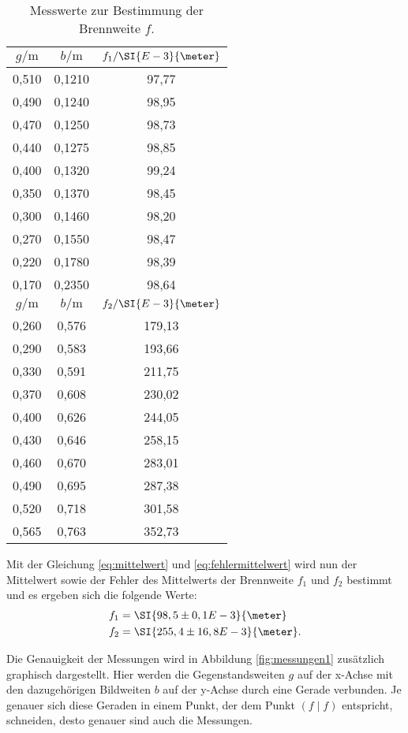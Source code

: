 \begin{table}[htpb]
	\centering
	\caption{Messwerte zur Bestimmung der Brennweite $f$.}
	\label{tab:ersterVersuchsteil}
	\begin{tabular}{c c c}
		\toprule
		$g / \si{\meter}$ & $b / \si{\meter}$ & $f_1 / \SI{E-3}{\meter}$ \\
		\midrule
		0,510 &	0,1210& 97,77 \\
		0,490&	0,1240& 98,95 \\
		0,470&	0,1250& 98,73 \\
		0,440&	0,1275& 98,85 \\
		0,400&	0,1320& 99,24 \\
		0,350&	0,1370& 98,45 \\
		0,300&	0,1460& 98,20 \\
		0,270&	0,1550& 98,47 \\
		0,220&	0,1780& 98,39 \\
		0,170&	0,2350& 98,64 \\	
		\midrule
		$g / \si{\meter}$ & $b / \si{\meter}$ & $f_2 / \SI{E-3}{\meter}$ \\
		\midrule
		0,260&	0,576& 179,13\\
		0,290&	0,583& 193,66\\
		0,330&	0,591& 211,75\\
		0,370&	0,608& 230,02\\
		0,400&	0,626& 244,05\\
		0,430&	0,646& 258,15\\
		0,460&	0,670& 283,01\\
		0,490&	0,695& 287,38\\
		0,520&	0,718& 301,58\\
		0,565&	0,763& 352,73\\
		\bottomrule
	\end{tabular}
\end{table}

Mit der Gleichung \ref{eq:mittelwert} und \ref{eq:fehlermittelwert} wird nun der Mittelwert sowie der Fehler des Mittelwerts der Brennweite $f_1$ und $f_2$ bestimmt und es ergeben sich die folgende Werte:
\begin{align*}
f_1 &= \SI{98,5 \pm 0,1 E-3}{\meter} \\
f_2 &= \SI{255,4 \pm 16,8 E-3}{\meter}.
\end{align*}

Die Genauigkeit der Messungen wird in Abbildung \ref{fig:messungen1} zusätzlich graphisch dargestellt. Hier werden die Gegenstandsweiten $g$ auf der x-Achse mit den dazugehörigen Bildweiten $b$ auf der y-Achse durch eine Gerade verbunden. Je genauer sich diese Geraden in einem Punkt, der dem Punkt $(f \mid f)$ entspricht, schneiden, desto genauer sind auch die Messungen. 

